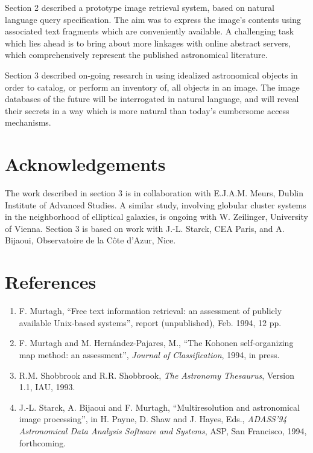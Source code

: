 Section 2 described a prototype image retrieval system, based on natural
language query specification.  The aim was to express the image's contents
using associated text fragments which are conveniently available.  A 
challenging task which lies ahead is to bring about more linkages with 
online abstract servers, which comprehensively represent the published
astronomical literature.

Section 3 described on-going research in using idealized astronomical 
objects in order to catalog, or perform an inventory of, all objects in an
image.  The image databases of the future will be interrogated in natural
language, and will reveal their secrets in a way which is more natural than 
today's cumbersome access mechanisms.
 
\section*{Acknowledgements}

The work described in section 3 is in collaboration with E.J.A.M. Meurs,
Dublin Institute of Advanced Studies.  A similar study, involving globular
cluster systems in the neighborhood of elliptical galaxies, is ongoing with
W. Zeilinger, University of Vienna.  Section 3 is based on work with J.-L. 
Starck, CEA Paris,  and A. Bijaoui, Observatoire de la C\^ote d'Azur, Nice.

\section*{References}

\begin{enumerate}

\item F. Murtagh, ``Free text information retrieval: an assessment of 
publicly available Unix-based systems'', report (unpublished), Feb. 1994, 
12 pp.

\item F. Murtagh and M. Hern{\'a}ndez-Pajares, M., ``The Kohonen 
     self-organizing map method: an assessment'', {\it Journal of 
     Classification},  1994, in press.

\item R.M. Shobbrook and R.R. Shobbrook, {\it The Astronomy Thesaurus}, Version
1.1, IAU, 1993.

\item J.-L. Starck, A. Bijaoui and F. Murtagh, ``Multiresolution and 
astronomical image processing'', in H. Payne, D. Shaw and J. Hayes,
Eds., {\it ADASS'94 Astronomical Data Analysis Software and Systems},
ASP, San Francisco, 1994, forthcoming.

\end{enumerate}




\bye

